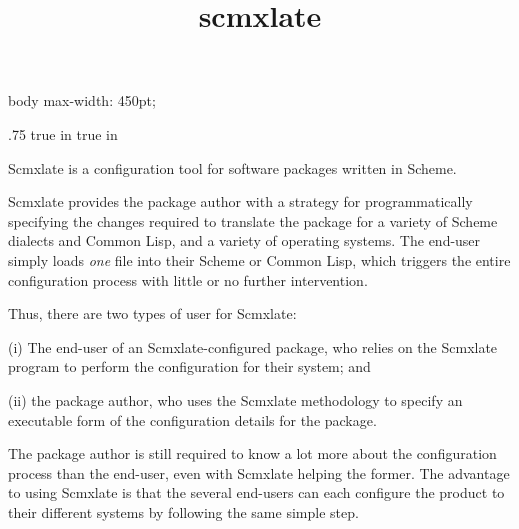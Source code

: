 
%

%


\ifx\shipout\UnDeFiNeD
\cssblock
body { max-width: 450pt; }
\endcssblock
\fi

\let\TZPtexlayout 0
\let\n\noindent
\let\f\numberedfootnote
\let\q\scm

\ifx\shipout\toHTML
\let\oldsection\section
\def\section{\eject\oldsection}
\fi
\let\re\subsection

\advance\hoffset .75 true in
\advance{} true in

\title{scmxlate}


\centerline{}

\centerline{}

\medskip

Scmxlate is a configuration tool for software
packages written in Scheme.

Scmxlate provides the package author with a strategy
for programmatically specifying the changes required to
translate the package for a variety of Scheme dialects
and Common Lisp, and a variety of operating systems.
The end-user simply loads {\em one} file into
their Scheme or Common Lisp, which triggers the entire
configuration process with little or no further
intervention.

Thus, there are two types of user for Scmxlate:

(i) The end-user of an Scmxlate-configured package, who
relies on the
Scmxlate program to perform the configuration
for their system; and

(ii) the package author, who uses the Scmxlate
methodology to specify an executable form of the
configuration details for the package.

\n The package author is still required to know a lot more
about the configuration process than the end-user, even
with Scmxlate helping the former.
The advantage to using Scmxlate is that the several
end-users can each configure the product to their
different systems by following the same simple
step.

